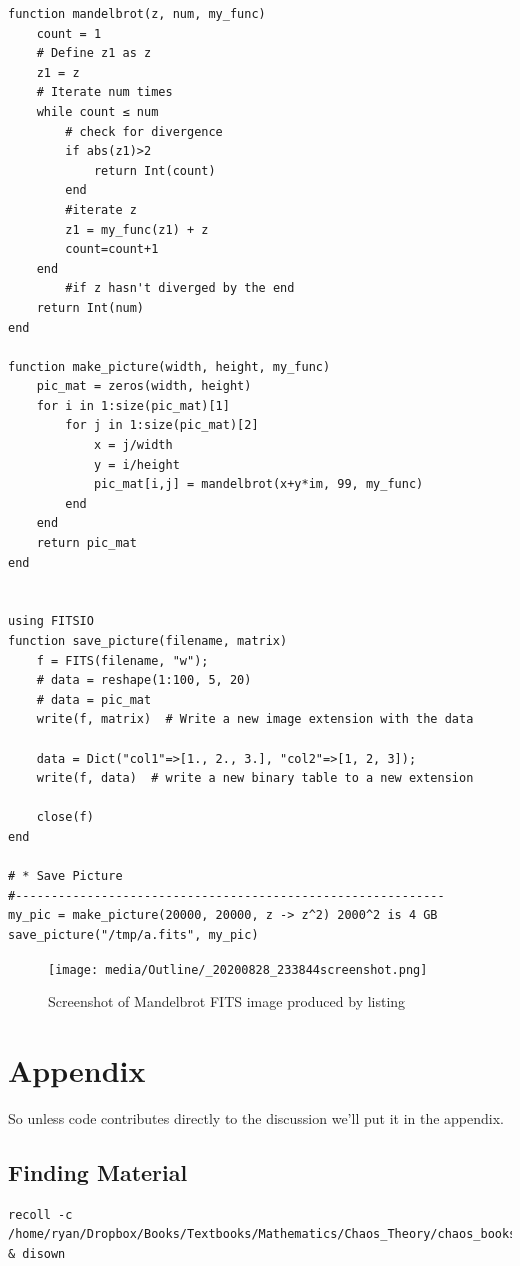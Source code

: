 \documentclass[a4paper,11pt,twoside]{article}
\begin{document}
\begin{verbatim}
function mandelbrot(z, num, my_func)
    count = 1
    # Define z1 as z
    z1 = z
    # Iterate num times
    while count ≤ num
        # check for divergence
        if abs(z1)>2
            return Int(count)
        end
        #iterate z
        z1 = my_func(z1) + z
        count=count+1
    end
        #if z hasn't diverged by the end
    return Int(num)
end

function make_picture(width, height, my_func)
    pic_mat = zeros(width, height)
    for i in 1:size(pic_mat)[1]
        for j in 1:size(pic_mat)[2]
            x = j/width
            y = i/height
            pic_mat[i,j] = mandelbrot(x+y*im, 99, my_func)
        end
    end
    return pic_mat
end


using FITSIO
function save_picture(filename, matrix)
    f = FITS(filename, "w");
    # data = reshape(1:100, 5, 20)
    # data = pic_mat
    write(f, matrix)  # Write a new image extension with the data

    data = Dict("col1"=>[1., 2., 3.], "col2"=>[1, 2, 3]);
    write(f, data)  # write a new binary table to a new extension

    close(f)
end

# * Save Picture
#------------------------------------------------------------
my_pic = make_picture(20000, 20000, z -> z^2) 2000^2 is 4 GB
save_picture("/tmp/a.fits", my_pic)

\end{verbatim}

\begin{figure}[htbp]
\centering
\texttt{[image: media/Outline/\_20200828\_233844screenshot.png]}
\caption{\label{mandelbrot-screen}Screenshot of Mandelbrot FITS image produced by listing }
\end{figure}

\section{Appendix}
\label{appendix}
So unless code contributes directly to the discussion we'll put it in the appendix.
 \appendix 
\subsection{Finding Material}
\label{sec:org9bd493d}
\begin{verbatim}
recoll -c /home/ryan/Dropbox/Books/Textbooks/Mathematics/Chaos_Theory/chaos_books_recoll & disown
\end{verbatim}
\end{document}
